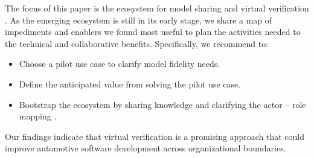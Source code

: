 The focus of this paper is 
the ecosystem for model sharing and virtual verification .
As the emerging ecosystem is still in its early stage,
we share a map of impediments and enablers we found most useful to plan the activities needed to  the technical and collaborative benefits.
Specifically, we recommend to:
\begin{itemize}
    \item Choose a pilot use case to clarify model fidelity needs.
    \item Define the anticipated value from solving the pilot use case.
    \item Bootstrap the ecosystem by sharing knowledge and clarifying the actor -- role mapping \cite{kilamo2012proprietary} .
\end{itemize}

Our findings indicate that virtual verification is a promising approach that could improve automotive software development across organizational boundaries.






